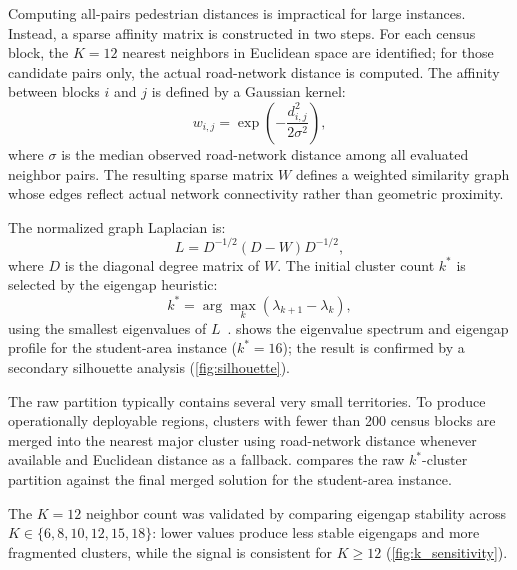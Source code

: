 Computing all-pairs pedestrian distances is impractical for large instances.
Instead, a sparse affinity matrix is constructed in two steps.
For each census block, the $K = 12$ nearest neighbors in Euclidean space are
identified; for those candidate pairs only, the actual road-network distance
is computed.
The affinity between blocks $i$ and $j$ is defined by a Gaussian kernel:
\begin{equation}
  w_{i,j} = \exp\!\left(-\frac{d_{i,j}^{2}}{2\sigma^{2}}\right),
  \label{eq:affinity}
\end{equation}
where $\sigma$ is the median observed road-network distance among all evaluated
neighbor pairs.
The resulting sparse matrix $W$ defines a weighted similarity graph
whose edges reflect actual network connectivity rather than geometric proximity.

The normalized graph Laplacian is:
\begin{equation}
  L = D^{-1/2}(D - W)D^{-1/2},
  \label{eq:laplacian}
\end{equation}
where $D$ is the diagonal degree matrix of $W$.
The initial cluster count $k^*$ is selected by the eigengap heuristic:
\begin{equation}
  k^* = \arg\max_k \left(\lambda_{k+1} - \lambda_k\right),
  \label{eq:eigengap}
\end{equation}
using the smallest eigenvalues of $L$~\cite{vonluxburg2007tutorial}.
 shows the eigenvalue spectrum and eigengap profile
for the student-area instance ($k^* = 16$); the result is confirmed by a
secondary silhouette analysis (\cref{fig:silhouette}).

The raw partition typically contains several very small territories.
To produce operationally deployable regions, clusters with fewer than
200 census blocks are merged into the nearest major cluster using
road-network distance whenever available and Euclidean distance as a fallback.
 compares the raw $k^*$-cluster partition against
the final merged solution for the student-area instance.

The $K = 12$ neighbor count was validated by comparing eigengap stability
across $K \in \{6, 8, 10, 12, 15, 18\}$: lower values produce less stable
eigengaps and more fragmented clusters, while the signal is consistent
for $K \geq 12$ (\cref{fig:k_sensitivity}).

